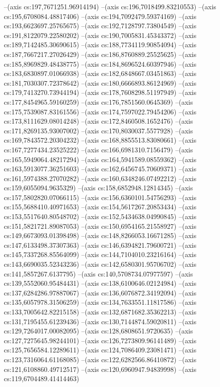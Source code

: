 --(axis cs:197,7671251.96914194)
--(axis cs:196,7018499.83210553)
--(axis cs:195,6708084.48817406)
--(axis cs:194,7092479.59374169)
--(axis cs:193,6623697.25765675)
--(axis cs:192,7128797.73804549)
--(axis cs:191,8122079.22580202)
--(axis cs:190,7005831.45343372)
--(axis cs:189,7142485.30690615)
--(axis cs:188,7734119.90854094)
--(axis cs:187,7667217.27026429)
--(axis cs:186,8760889.25525625)
--(axis cs:185,8969829.48438775)
--(axis cs:184,8696524.60397946)
--(axis cs:183,6830897.01066938)
--(axis cs:182,6848667.03451863)
--(axis cs:181,7030307.72378642)
--(axis cs:180,6666893.86124969)
--(axis cs:179,7413270.73944194)
--(axis cs:178,7608298.51197949)
--(axis cs:177,8454965.59160259)
--(axis cs:176,7851560.0645369)
--(axis cs:175,7539087.83161556)
--(axis cs:174,7597022.79454206)
--(axis cs:173,8111629.08014248)
--(axis cs:172,8460508.1652476)
--(axis cs:171,8269135.93007002)
--(axis cs:170,8030037.5577928)
--(axis cs:169,7843572.20304232)
--(axis cs:168,8855513.83080661)
--(axis cs:167,7277434.23525222)
--(axis cs:166,6981310.7156479)
--(axis cs:165,5949064.48217294)
--(axis cs:164,5941589.08559362)
--(axis cs:163,5913077.36251603)
--(axis cs:162,6456745.70609371)
--(axis cs:161,5974388.27070282)
--(axis cs:160,6348246.07492212)
--(axis cs:159,6055094.9635329)
--(axis cs:158,6852948.12814345)
--(axis cs:157,5802820.07066115)
--(axis cs:156,6360101.54756293)
--(axis cs:155,5688410.40971653)
--(axis cs:154,5617267.20853434)
--(axis cs:153,5517640.80548702)
--(axis cs:152,5434638.04990845)
--(axis cs:151,5821721.89087053)
--(axis cs:150,6954165.21558927)
--(axis cs:149,6673093.01398498)
--(axis cs:148,8266053.16671285)
--(axis cs:147,6133498.37307363)
--(axis cs:146,6394821.79600721)
--(axis cs:145,7337268.85564099)
--(axis cs:144,7104010.23216164)
--(axis cs:143,6690035.52343236)
--(axis cs:142,6580301.95706702)
--(axis cs:141,5857267.6137795)
--(axis cs:140,5708734.07977597)
--(axis cs:139,5552060.95484431)
--(axis cs:138,6100646.02124984)
--(axis cs:137,6284286.97887067)
--(axis cs:136,6076872.34192094)
--(axis cs:135,6057978.31506259)
--(axis cs:134,7633551.11817586)
--(axis cs:133,7005642.82215158)
--(axis cs:132,6871682.35362213)
--(axis cs:131,7195455.61239436)
--(axis cs:130,7144874.59020811)
--(axis cs:129,7264017.00082095)
--(axis cs:128,6808651.9720635)
--(axis cs:127,7275645.98244101)
--(axis cs:126,7273809.96141489)
--(axis cs:125,7656584.12289611)
--(axis cs:124,7086409.23081471)
--(axis cs:123,7316064.61168085)
--(axis cs:122,6282566.86410872)
--(axis cs:121,6108860.49712517)
--(axis cs:120,6960947.94839998)
--(axis cs:119,6704489.41414463)
